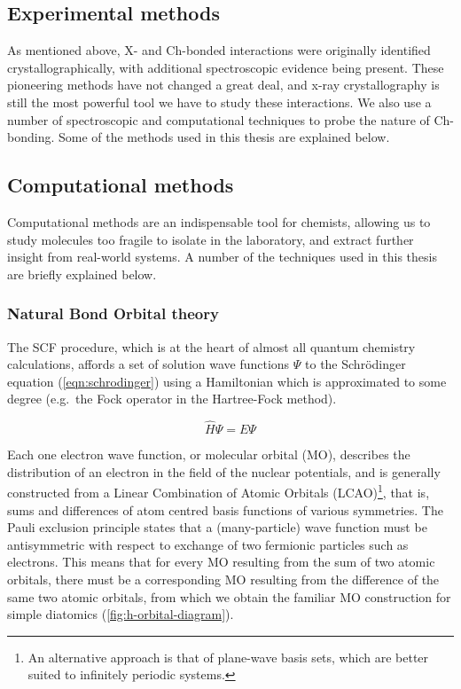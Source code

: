 \begin{refsection}

\chapter{Experimental methods}
As mentioned above, X- and Ch-bonded interactions were originally identified crystallographically, with additional spectroscopic evidence being present.
These pioneering methods have not changed a great deal, and x-ray crystallography is still the most powerful tool we have to study these interactions.
We also use a number of spectroscopic and computational techniques to probe the nature of Ch-bonding.
Some of the methods used in this thesis are explained below.

\section{Computational methods}
Computational methods are an indispensable tool for chemists, allowing us to study molecules too fragile to isolate in the laboratory, and extract further insight from real-world systems.
A number of the techniques used in this thesis are briefly explained below.

\subsection{Natural Bond Orbital theory}
The SCF procedure, which is at the heart of almost all quantum chemistry calculations, affords a set of solution wave functions $ \Psi $ to the Schr\"{o}dinger equation (\cref{eqn:schrodinger}) using a Hamiltonian which is approximated to some degree (e.g.\ the Fock operator in the Hartree-Fock method).

\begin{equation}
    \hat{H}\Psi = E\Psi
    \label{eqn:schrodinger}
\end{equation}

Each one electron wave function, or molecular orbital (MO), describes the distribution of an electron in the field of the nuclear potentials, and is generally constructed from a Linear Combination of Atomic Orbitals (LCAO)\footnote{An alternative approach is that of plane-wave basis sets, which are better suited to infinitely periodic systems.}, that is, sums and differences of atom centred basis functions of various symmetries.
The Pauli exclusion principle states that a (many-particle) wave function must be antisymmetric with respect to exchange of two fermionic particles such as electrons.
This means that for every MO resulting from the sum of two atomic orbitals, there must be a corresponding MO resulting from the difference of the same two atomic orbitals, from which we obtain the familiar MO construction for simple diatomics (\cref{fig:h-orbital-diagram}).


\end{refsection}
